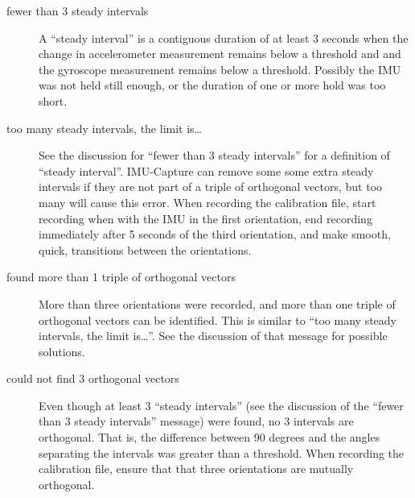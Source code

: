 \documentclass[11pt,letterpaper,article,oneside]{memoir}
\newcommand{\name}{IMU-Capture}
\begin{document}
\begin{description}

\item[fewer than 3 steady intervals]
A ``steady interval'' is a contiguous duration of at least 3 seconds when the
change in accelerometer measurement remains below a threshold and and the
gyroscope measurement remains below a threshold. Possibly the IMU was not held
still enough, or the duration of one or more hold was too short.

\item[too many steady intervals, the limit is\ldots]
See the discussion for ``fewer than 3 steady intervals'' for a definition of
``steady interval''.  \name{} can remove some some extra steady intervals if
they are not part of a triple of orthogonal vectors, but too many will cause
this error. When recording the calibration file, start recording when with the
IMU in the first orientation, end recording immediately after 5 seconds of the
third orientation, and make smooth, quick, transitions between the orientations.

\item[found more than 1 triple of orthogonal vectors]
More than three orientations were recorded, and more than one triple of
orthogonal vectors can be identified.  This is similar to ``too many steady
intervals, the limit is\ldots''. See the discussion of that message for possible
solutions.

\item[could not find 3 orthogonal vectors]
Even though at least 3 ``steady intervals'' (see the discussion of the ``fewer
than 3 steady intervals'' message) were found, no 3 intervals are orthogonal.
That is, the difference between 90 degrees and the angles separating the
intervals was greater than a threshold. When recording the calibration file,
ensure that that three orientations are mutually orthogonal.


\end{description}
\end{document}
